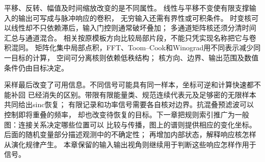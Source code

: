 平移、反转、幅值及时间缩放改变的是不同属性。
线性与平移不变使有限支撑输入的输出可写成与脉冲响应的卷积，
无穷输入还需有界性或可积条件。
时变核可以线性却不只依赖滞后，输入门控则通常破坏叠加；
多通道矩阵核还须分清时间汇总与通道混合。
相关按原模板方向比较局部片段，不能只凭实现名称把它与卷积混同。
矩阵化集中局部点积，FFT、Toom--Cook和Winograd用不同表示减少同一目标的计算，
空间可分离核则依赖低秩结构；
核方向、边界、输出范围及数值条件仍由目标决定。

采样最后改变了可用信息。不同信号可能具有同一样本，坐标可逆和计算快速都不能补回
已经消失的区别。带限有限能量类、规范连续代表元及足够密的无限样本共同给出sinc恢复；
有限记录和功率信号需要各自核对边界。抗混叠预滤波可以控制即将重叠的频率，
却也改变待恢复的目标。下一章把规则索引推广为一般图：连接关系决定哪些位置可以
比较与传播，图上的谱则提供相应的变化坐标。后面的随机变量部分描述观测中的不确定性；
再增加内部状态，解释响应核怎样从演化规律产生。
本章保留的输入输出视角则继续用于判断这些响应怎样作用于信号。
